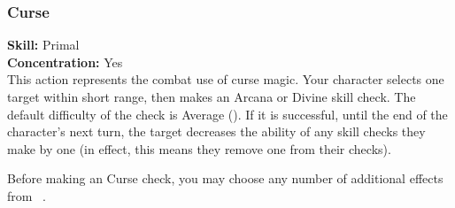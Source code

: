 \subsubsection{Curse}
\textbf{Skill:} Primal\\
\textbf{Concentration:} Yes\\
This action represents the combat use of curse magic. Your
character selects one target within short range, then makes
an Arcana or Divine skill check. The default difficulty of
the check is Average (\difficulty\difficulty). If it is successful, until the
end of the character’s next turn, the target decreases the
ability of any skill checks they make by one (in effect, this
means they remove one \proficiency from their checks).
 
Before making an Curse check, you may choose any number of
additional effects from ~.
